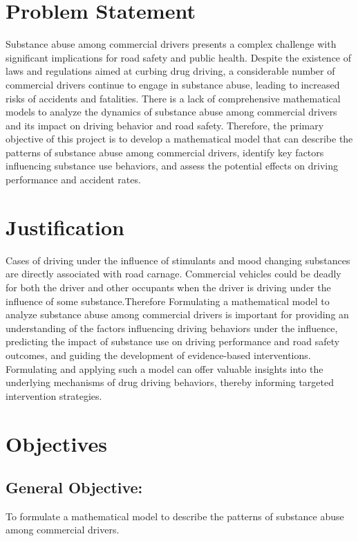 \documentclass[12pt]{report}
\begin{document}
	
\section{Problem Statement}


	Substance abuse among commercial drivers presents a complex challenge with significant implications for road safety and public health. Despite the existence of laws and regulations aimed at curbing drug driving, a considerable number of commercial drivers continue to engage in substance abuse, leading to increased risks of accidents and fatalities. There is a lack of comprehensive mathematical models to analyze the dynamics of substance abuse among commercial drivers and its impact on driving behavior and road safety. Therefore, the primary objective of this project is to develop a mathematical model that can describe the patterns of substance abuse among commercial drivers, identify key factors influencing substance use behaviors, and assess the potential effects on driving performance and accident rates.
	\section{Justification}
	
	Cases of driving under the influence of stimulants and mood changing substances are directly associated with road carnage. Commercial vehicles could be deadly for both the driver and other occupants when the driver is driving under the influence of some substance.Therefore 
	Formulating a mathematical model to analyze substance abuse among commercial drivers is important for providing an understanding of the factors influencing driving behaviors under the influence, predicting the impact of substance use on driving performance and road safety outcomes, and guiding the development of evidence-based interventions. Formulating and applying such a model can offer valuable insights into the underlying mechanisms of drug driving behaviors, thereby informing targeted intervention strategies.
	
	
	\section{Objectives}
	
	\subsection{General Objective:}

	To formulate a mathematical model to describe the patterns of substance abuse among commercial drivers.
\end{document}
